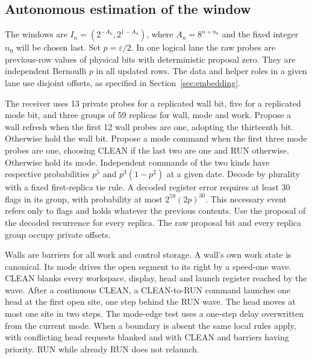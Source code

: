 \subsection{Autonomous estimation of the window}\label{sec:receiver}

The windows are \(I_n=(2^{-A_n},2^{1-A_n})\), where \(A_n=8^{n+n_0}\) and the fixed integer \(n_0\) will be chosen last. Set \(p=\varepsilon/2\). In one logical lane the raw probes are previous-row values of physical bits with deterministic proposal zero. They are independent Bernoulli \(p\) in all updated rows. The data and helper roles in a given lane use disjoint offsets, as specified in Section~\ref{sec:embedding}.

The receiver uses 13 private probes for a replicated wall bit, five for a replicated mode bit, and three groups of 59 replicas for wall, mode and work. Propose a wall refresh when the first 12 wall probes are one, adopting the thirteenth bit. Otherwise hold the wall bit. Propose a mode command when the first three mode probes are one, choosing CLEAN if the last two are one and RUN otherwise. Otherwise hold its mode. Independent commands of the two kinds have respective probabilities \(p^5\) and \(p^3(1-p^2)\) at a given date. Decode by plurality with a fixed first-replica tie rule. A decoded register error requires at least 30 flags in its group, with probability at most \(2^{59}(2p)^{30}\). This necessary event refers only to flags and holds whatever the previous contents. Use the proposal of the decoded recurrence for every replica. The raw proposal bit and every replica group occupy private offsets.

Walls are barriers for all work and control storage. A wall's own work state is canonical. Its mode drives the open segment to its right by a speed-one wave. CLEAN blanks every workspace, display, head and launch register reached by the wave. After a continuous CLEAN, a CLEAN-to-RUN command launches one head at the first open site, one step behind the RUN wave. The head moves at most one site in two steps. The mode-edge test uses a one-step delay overwritten from the current mode. When a boundary is absent the same local rules apply, with conflicting head requests blanked and with CLEAN and barriers having priority. RUN while already RUN does not relaunch.

